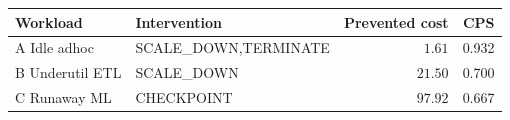 \begin{tabular}{p{3.2cm}p{2.6cm}rr}
\toprule
Workload & Intervention & Prevented cost & CPS \\
\midrule
A Idle adhoc & SCALE\_DOWN,\newline TERMINATE & $1.61$ & 0.932 \\
B Underutil ETL & SCALE\_DOWN & $21.50$ & 0.700 \\
C Runaway ML & CHECKPOINT & $97.92$ & 0.667 \\
\bottomrule
\end{tabular}
